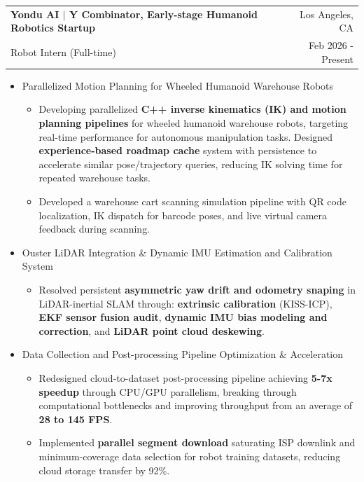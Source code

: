 \documentclass[a4paper,20pt]{article}
\makeatletter
\newcommand{\resumeResearchSubheadingShort}[4]{
  \vspace{5pt}\item
    \begin{tabular*} {0.98\textwidth} {@{\hspace{-0.5em}}l@{\extracolsep{\fill}}r@{}}
      \textbf{#1} & {#2}\null \\
      {#3} & {#4}
    \end{tabular*}
  \vspace{-6pt}
}
\newcommand{\resumeResearchItemListStart}{
  \begin{itemize} [leftmargin=*]
}
\newcommand{\resumeResearchItemListEnd}{
  \end{itemize}
  \vspace{-5pt}
}
\newcommand{\resumeResearchItem}[1]{
  \item{
    {#1 \vspace{-1pt}}
  }
}
\newcommand{\resumeResearchMidItemListStart}{
  \begin{itemize} [leftmargin=*]
}
\newcommand{\resumeResearchMidItemListEnd}{
  \end{itemize}
  \vspace{-5pt}
}
\newcommand{\resumeResearchMidItem}[2]{
  \item{
    \textbf{#1}
    {#2 \vspace{-2pt}}
  }
}
\makeatother
\begin{document}
\resumeResearchSubheadingShort
{Yondu AI \textnormal{\small{$|$ Y Combinator, Early-stage Humanoid Robotics Startup}}} {Los Angeles, CA}
{Robot Intern (Full-time)} {Feb 2026 - Present}
\resumeResearchMidItemListStart
\resumeResearchMidItem{}
{Parallelized Motion Planning for Wheeled Humanoid Warehouse Robots}
{
  \resumeResearchItemListStart
  \resumeResearchItem{}
  {Developing parallelized \textbf{C++ inverse kinematics (IK) and motion planning pipelines} for wheeled humanoid warehouse robots, targeting real-time performance for autonomous manipulation tasks.}
  {Designed \textbf{experience-based roadmap cache} system with persistence to accelerate similar pose/trajectory queries, reducing IK solving time for repeated warehouse tasks.}
  \resumeResearchItem{}
  {Developed a warehouse cart scanning simulation pipeline with QR code         
  localization, IK dispatch for barcode poses, and live virtual camera feedback during scanning.}
  \resumeResearchItemListEnd
}
\resumeResearchMidItem{}
{Ouster LiDAR Integration \& Dynamic IMU Estimation and Calibration System}
{
  \resumeResearchItemListStart
  \resumeResearchItem{}
  {Resolved persistent \textbf{asymmetric yaw drift and odometry snaping} in LiDAR-inertial SLAM through: \textbf{extrinsic calibration} (KISS-ICP), \textbf{EKF sensor fusion audit}, \textbf{dynamic IMU bias modeling and correction}, and \textbf{LiDAR point cloud deskewing}.}
  \resumeResearchItemListEnd
}
\resumeResearchMidItem{}
{Data Collection and Post-processing Pipeline Optimization \& Acceleration}
{
  \resumeResearchItemListStart
  \resumeResearchItem{} %
  {Redesigned cloud-to-dataset post-processing pipeline achieving \textbf{5-7x speedup} through CPU/GPU parallelism, breaking through computational bottlenecks and improving throughput from an average of \textbf{28 to 145 FPS}.}
  \resumeResearchItem{}
  {Implemented \textbf{parallel segment download} saturating ISP downlink and minimum-coverage data selection for robot training
  datasets, reducing cloud storage transfer by 92\%.}
  \resumeResearchItemListEnd
}
\resumeResearchMidItemListEnd
\end{document}
